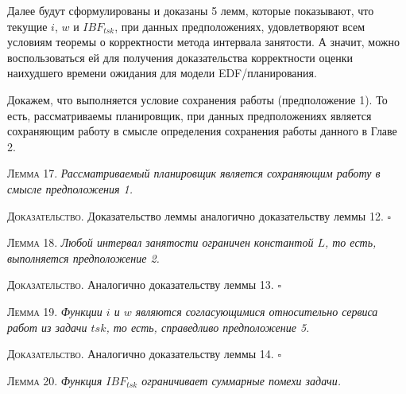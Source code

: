 Далее будут сформулированы и доказаны 5 лемм, которые показывают, что
  текущие $i$, $w$ и $IBF_{tsk}$, при данных предположениях, удовлетворяют всем условиям
  теоремы о корректности метода интервала занятости. А значит, можно воспользоваться ей
  для получения доказательства корректности оценки наихудшего времени ожидания для модели EDF\-/планирования.

Докажем, что выполняется условие сохранения работы (предположение 1).
  То есть, рассматриваемы планировщик, при данных предположениях является
  сохраняющим работу в смысле определения сохранения работы данного в Главе 2.

\textsc{Лемма 17.}
\textit{Рассматриваемый планировщик является сохраняющим работу в смысле предположения 1.}

\textsc{Доказательство.} Доказательство леммы аналогично доказательству леммы 12. $\square$


\textsc{Лемма 18.}
\textit{Любой интервал занятости ограничен константой $L$, то есть, выполняется предположение 2. }

\textsc{Доказательство.} Аналогично доказательству леммы 13. $\square$


\textsc{Лемма 19.}
\textit{Функции $i$ и $w$ являются согласующимися относительно сервиса
  работ из задачи $tsk$, то есть, справедливо предположение 5. }

\textsc{Доказательство.} Аналогично доказательству леммы 14. $\square$


\textsc{Лемма 20.}
\textit{Функция $IBF_{tsk}$ ограничивает суммарные помехи задачи. }

